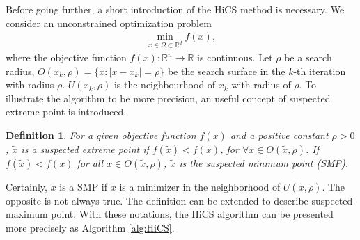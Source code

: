 \documentclass[final,1p,times]{elsarticle}
\newtheorem{definition}{Definition}
\newtheorem{proposition}{Proposition}
\def\bbR{\mathbb{R}}
\begin{document}
Before going further, a short introduction of the
HiCS method is necessary.
We consider an unconstrained optimization problem 
\begin{align}
	\min_{x\in\Omega\subset\mathbb{R}^d} f(x),
	\label{}
\end{align}
where the objective function $f(x):\bbR^n\rightarrow \bbR$ is
continuous. Let $\rho$ be a search radius, $O(x_k, \rho)=\{x:
|x-x_k|=\rho\}$ be the search surface in the
$k$-th iteration with radius $\rho$. $U(x_k,
\rho)$ is the neighbourhood of $x_k$ with radius of $\rho$.
To illustrate the algorithm to be more precision, an useful concept of
suspected extreme point is introduced.
\begin{definition}	
	For a given objective function $f(x)$ and a positive constant 
	$\rho>0$, $\tilde{x}$ is a suspected extreme point if $f(\tilde
	x)<f(x)$, for $\forall x\in O(\tilde{x},\rho)$.
	If $f(\tilde x) < f(x)$ for all $x\in O(\tilde{x},\rho)$,
	$\tilde{x}$ is the suspected minimum point (SMP).
\end{definition}
Certainly, $\tilde{x}$ is a SMP if $\tilde{x}$ is a minimizer in
the neighborhood of $U(\tilde{x}, \rho)$. The opposite is not always true.
The definition can be extended to describe suspected maximum point.
With these notations, the HiCS algorithm can be presented
more precisely as Algorithm \ref{alg:HiCS}.
\end{document}
